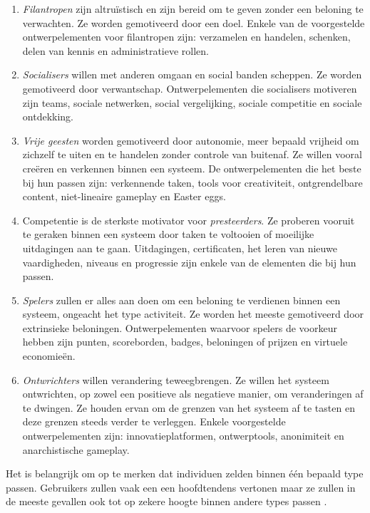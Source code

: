\begin{enumerate}[label=(\arabic*)]
    \item \textit{Filantropen} zijn altruïstisch en zijn bereid om te geven zonder een beloning te verwachten. Ze worden gemotiveerd door een doel. Enkele van de voorgestelde ontwerpelementen voor filantropen zijn: verzamelen en handelen, schenken, delen van kennis en administratieve rollen.
    \item \textit{Socialisers} willen met anderen omgaan en social banden scheppen. Ze worden gemotiveerd door verwantschap. Ontwerpelementen die socialisers motiveren zijn teams, sociale netwerken, social vergelijking, sociale competitie en sociale ontdekking.
    \item \textit{Vrije geesten} worden gemotiveerd door autonomie, meer bepaald vrijheid om zichzelf te uiten en te handelen zonder controle van buitenaf. Ze willen vooral creëren en verkennen binnen een systeem. De ontwerpelementen die het beste bij hun passen zijn: verkennende taken, tools voor creativiteit, ontgrendelbare content, niet-lineaire gameplay en Easter eggs.
    \item Competentie is de sterkste motivator voor \textit{presteerders}. Ze proberen vooruit te geraken binnen een systeem door taken te voltooien of moeilijke uitdagingen aan te gaan. Uitdagingen, certificaten, het leren van nieuwe vaardigheden, niveaus en progressie zijn enkele van de elementen die bij hun passen.
    \item \textit{Spelers} zullen er alles aan doen om een beloning te verdienen binnen een systeem, ongeacht het type activiteit. Ze worden het meeste gemotiveerd door extrinsieke beloningen. Ontwerpelementen waarvoor spelers de voorkeur hebben zijn punten, scoreborden, badges, beloningen of prijzen en virtuele economieën.
    \item \textit{Ontwrichters} willen verandering teweegbrengen. Ze willen het systeem ontwrichten, op zowel een positieve als negatieve manier, om veranderingen af te dwingen. Ze houden ervan om de grenzen van het systeem af te tasten en deze grenzen steeds verder te verleggen. Enkele voorgestelde ontwerpelementen zijn: innovatieplatformen, ontwerptools, anonimiteit en anarchistische gameplay.
\end{enumerate}

Het is belangrijk om op te merken dat individuen zelden binnen één bepaald type passen. Gebruikers zullen vaak een een hoofdtendens vertonen maar ze zullen in de meeste gevallen ook tot op zekere hoogte binnen andere types passen \autocite{Tondello2016}.

